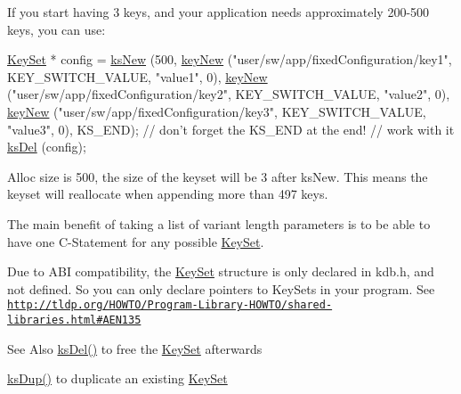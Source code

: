 If you start having 3 keys, and your application needs approximately 200-\/500 keys, you can use\-: 
\begin{DoxyCode}
\hyperlink{classkdb_1_1KeySet_a4eac9850fa4f06c07a5306befc3e4377}{KeySet} * config = \hyperlink{group__keyset_ga671e1aaee3ae9dc13b4834a4ddbd2c3c}{ksNew} (500,
        \hyperlink{group__key_gaf6893c038b3ebee90c73a9ea8356bebf}{keyNew} (\textcolor{stringliteral}{"user/sw/app/fixedConfiguration/key1"}, KEY\_SWITCH\_VALUE, \textcolor{stringliteral}{
      "value1"}, 0),
        \hyperlink{group__key_gaf6893c038b3ebee90c73a9ea8356bebf}{keyNew} (\textcolor{stringliteral}{"user/sw/app/fixedConfiguration/key2"}, KEY\_SWITCH\_VALUE, \textcolor{stringliteral}{
      "value2"}, 0),
        \hyperlink{group__key_gaf6893c038b3ebee90c73a9ea8356bebf}{keyNew} (\textcolor{stringliteral}{"user/sw/app/fixedConfiguration/key3"}, KEY\_SWITCH\_VALUE, \textcolor{stringliteral}{
      "value3"}, 0),
        KS\_END); \textcolor{comment}{// don't forget the KS\_END at the end!}
\textcolor{comment}{// work with it}
\hyperlink{group__keyset_ga27e5c16473b02a422238c8d970db7ac8}{ksDel} (config);
\end{DoxyCode}
 Alloc size is 500, the size of the keyset will be 3 after ks\-New. This means the keyset will reallocate when appending more than 497 keys.

The main benefit of taking a list of variant length parameters is to be able to have one C-\/\-Statement for any possible \hyperlink{classkdb_1_1KeySet}{Key\-Set}.

Due to A\-B\-I compatibility, the {\ttfamily \hyperlink{classkdb_1_1KeySet}{Key\-Set}} structure is only declared in kdb.\-h, and not defined. So you can only declare {\ttfamily pointers} to {\ttfamily Key\-Sets} in your program. See \href{http://tldp.org/HOWTO/Program-Library-HOWTO/shared-libraries.html#AEN135}{\tt http\-://tldp.\-org/\-H\-O\-W\-T\-O/\-Program-\/\-Library-\/\-H\-O\-W\-T\-O/shared-\/libraries.\-html\#\-A\-E\-N135}

\begin{DoxySeeAlso}{See Also}
\hyperlink{group__keyset_ga27e5c16473b02a422238c8d970db7ac8}{ks\-Del()} to free the \hyperlink{group__keyset}{Key\-Set} afterwards 

\hyperlink{group__keyset_gac59e4b328245463f1451f68d5106151c}{ks\-Dup()} to duplicate an existing \hyperlink{group__keyset}{Key\-Set} 
\end{DoxySeeAlso}


